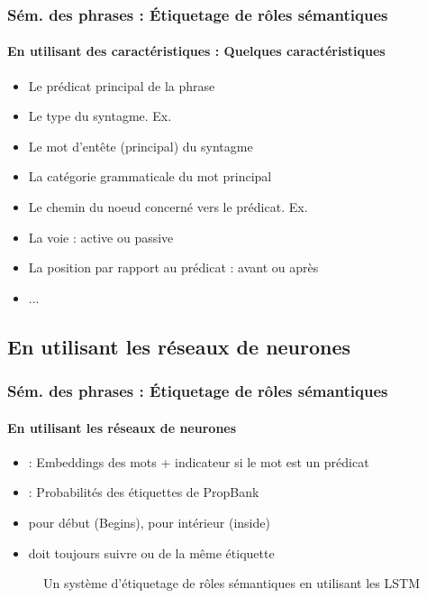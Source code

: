 \documentclass[xcolor=table]{beamer}
\begin{document}
\begin{frame}
	\frametitle{Sém. des phrases : Étiquetage de rôles sémantiques}
	\framesubtitle{En utilisant des caractéristiques : Quelques caractéristiques}
	
	\begin{itemize}
		\item Le prédicat principal de la phrase
		\item Le type du syntagme. Ex. 
		\item Le mot d'entête (principal) du syntagme
		\item La catégorie grammaticale du mot principal 
		\item Le chemin du noeud concerné vers le prédicat. Ex. 
		\item La voie : active ou passive
		\item La position par rapport au prédicat : avant ou après
		\item ...
	\end{itemize}
	
\end{frame}

\subsection{En utilisant les réseaux de neurones}

\begin{frame}
	\frametitle{Sém. des phrases : Étiquetage de rôles sémantiques}
	\framesubtitle{En utilisant les réseaux de neurones}

	\begin{minipage}{.48\textwidth}
		\begin{itemize}
			\item {} : Embeddings des mots + indicateur si le mot est un prédicat 
			\item {} : Probabilités des étiquettes de PropBank 
			\item {} pour début (Begins),  pour intérieur (inside)
			\item {} doit toujours suivre  ou  de la même étiquette
		\end{itemize}
	\end{minipage}
	\begin{minipage}{.5\textwidth}
		\begin{figure}
			\caption{Un système d'étiquetage de rôles sémantiques en utilisant les LSTM \cite{2017-he-al}}
		\end{figure}
	\end{minipage}
	
\end{frame}
\end{document}

